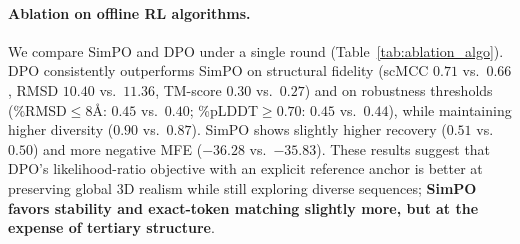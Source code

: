 \paragraph{Ablation on offline RL algorithms.}
We compare SimPO and DPO under a single round (Table~\ref{tab:ablation_algo}). DPO consistently outperforms SimPO on structural fidelity (scMCC $0.71$ vs.\ $0.66$, RMSD $10.40$ vs.\ $11.36$, TM-score $0.30$ vs.\ $0.27$) and on robustness thresholds (\%RMSD$\leq$8\AA: $0.45$ vs.\ $0.40$; \%pLDDT$\geq 0.70$: $0.45$ vs.\ $0.44$), while maintaining higher diversity ($0.90$ vs.\ $0.87$). SimPO shows slightly higher recovery ($0.51$ vs.\ $0.50$) and more negative MFE ($-36.28$ vs.\ $-35.83$). These results suggest that DPO’s likelihood-ratio objective with an explicit reference anchor is better at preserving global 3D realism while still exploring diverse sequences; \textbf{SimPO favors stability and exact-token matching slightly more, but at the expense of tertiary structure}.

\begin{table}[t]
\centering
\caption{Comparison of different RL algorithms (DPO and SimPO) with only a single round. DPO demonstrates superior performance across key metrics.}
\label{tab:ablation_algo}
\end{table}

